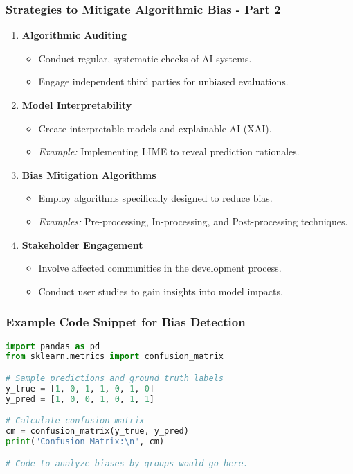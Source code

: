 \documentclass[aspectratio=169]{beamer}
\begin{document}
\begin{frame}[fragile]
    \frametitle{Strategies to Mitigate Algorithmic Bias - Part 2}
    \begin{enumerate}[resume]
        \item \textbf{Algorithmic Auditing}
        \begin{itemize}
            \item Conduct regular, systematic checks of AI systems.
            \item Engage independent third parties for unbiased evaluations.
        \end{itemize}
        
        \item \textbf{Model Interpretability}
        \begin{itemize}
            \item Create interpretable models and explainable AI (XAI).
            \item \textit{Example:} Implementing LIME to reveal prediction rationales.
        \end{itemize}
        
        \item \textbf{Bias Mitigation Algorithms}
        \begin{itemize}
            \item Employ algorithms specifically designed to reduce bias.
            \item \textit{Examples:} Pre-processing, In-processing, and Post-processing techniques.
        \end{itemize}
        
        \item \textbf{Stakeholder Engagement}
        \begin{itemize}
            \item Involve affected communities in the development process.
            \item Conduct user studies to gain insights into model impacts.
        \end{itemize}
    \end{enumerate}
\end{frame}

\begin{frame}[fragile]
    \frametitle{Example Code Snippet for Bias Detection}
    \begin{lstlisting}[language=Python]
import pandas as pd
from sklearn.metrics import confusion_matrix

# Sample predictions and ground truth labels
y_true = [1, 0, 1, 1, 0, 1, 0]
y_pred = [1, 0, 0, 1, 0, 1, 1]

# Calculate confusion matrix
cm = confusion_matrix(y_true, y_pred)
print("Confusion Matrix:\n", cm)

# Code to analyze biases by groups would go here.
    \end{lstlisting}
\end{frame}
\end{document}
